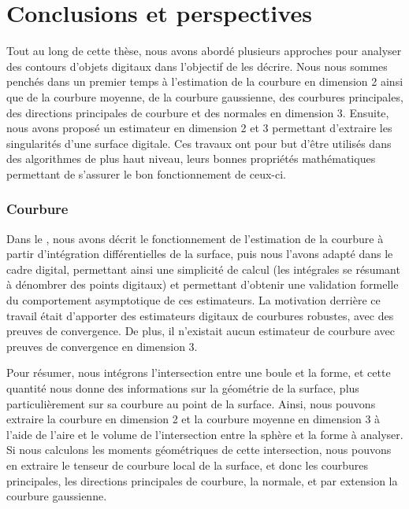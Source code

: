 %
\chapter{Conclusions et perspectives}
\label{sec:conclusion}


Tout au long de cette thèse, nous avons abordé plusieurs approches pour analyser
des contours d'objets digitaux dans l'objectif de les décrire. Nous nous sommes
penchés dans un premier temps à l'estimation de la courbure en dimension 2 ainsi
que de la courbure moyenne, de la courbure gaussienne, des courbures
principales, des directions principales de courbure et des normales en dimension
3. Ensuite, nous avons proposé un estimateur en dimension 2 et 3 permettant
d'extraire les singularités d'une surface digitale. Ces travaux ont pour but
d'être utilisés dans des algorithmes de plus haut niveau, leurs bonnes
propriétés mathématiques permettant de s'assurer le bon fonctionnement de
ceux-ci.

\subsection*{Courbure}
%
Dans le , nous avons décrit le fonctionnement de
l'estimation de la courbure à partir d'intégration différentielles de la
surface, puis nous l'avons adapté dans le cadre digital, permettant ainsi une
simplicité de calcul (les intégrales se résumant à dénombrer des points
digitaux) et permettant d'obtenir une validation formelle du comportement
asymptotique de ces estimateurs. La motivation derrière ce travail était
d'apporter des estimateurs digitaux de courbures robustes, avec des preuves de
convergence. De plus, il n'existait aucun estimateur de courbure avec preuves de
convergence en dimension 3.

Pour résumer, nous intégrons l'intersection entre une boule et la forme, et
cette quantité nous donne des informations sur la géométrie de la surface, plus
particulièrement sur sa courbure au point de la surface. Ainsi, nous pouvons
extraire la courbure en dimension 2 et la courbure moyenne en dimension 3 à
l'aide de \respp l'aire et le volume de l'intersection entre la sphère et la
forme à analyser. Si nous calculons les moments géométriques de cette
intersection, nous pouvons en extraire le tenseur de courbure local de la
surface, et donc les courbures principales, les directions principales de
courbure, la normale, et par extension la courbure gaussienne.


